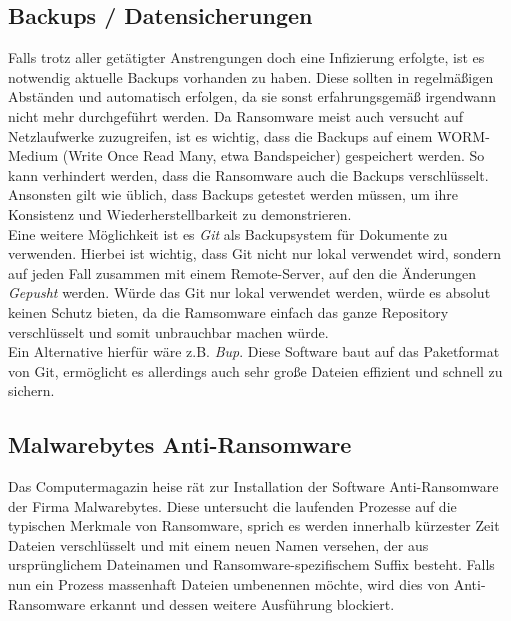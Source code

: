 \subsection{Backups / Datensicherungen}

	Falls trotz aller getätigter Anstrengungen doch eine Infizierung erfolgte, ist es notwendig aktuelle Backups vorhanden zu haben. Diese sollten in regelmäßigen Abständen und automatisch erfolgen, da sie sonst erfahrungsgemäß irgendwann nicht mehr durchgeführt werden. Da Ransomware meist auch versucht auf Netzlaufwerke zuzugreifen, ist es wichtig, dass die Backups auf einem WORM-Medium (Write Once Read Many, etwa Bandspeicher) gespeichert werden. So kann verhindert werden, dass die Ransomware auch die Backups verschlüsselt.\\
	Ansonsten gilt wie üblich, dass Backups getestet werden müssen, um ihre Konsistenz und Wiederherstellbarkeit zu demonstrieren.\\
	Eine weitere Möglichkeit ist es \textit{Git} als Backupsystem für Dokumente zu verwenden. Hierbei ist wichtig, dass Git nicht nur lokal verwendet wird, sondern auf jeden Fall zusammen mit einem Remote-Server, auf den die Änderungen \textit{Gepusht} werden. Würde das Git nur lokal verwendet werden, würde es absolut keinen Schutz bieten, da die Ramsomware einfach das ganze Repository verschlüsselt und somit unbrauchbar machen würde.\\
	Ein Alternative hierfür wäre z.B. \textit{Bup}. Diese Software baut auf das Paketformat von Git, ermöglicht es allerdings auch sehr große Dateien effizient und schnell zu sichern. \cite{bup}
	
	
	
\subsection{Malwarebytes Anti-Ransomware}

	Das Computermagazin \glqq heise\grqq{} rät zur Installation der Software \glqq Anti-Ransomware\grqq{} der Firma Malwarebytes. Diese untersucht die laufenden Prozesse auf die typischen Merkmale von Ransomware, sprich es werden innerhalb kürzester Zeit Dateien verschlüsselt und mit einem neuen Namen versehen, der aus ursprünglichem Dateinamen und Ransomware-spezifischem Suffix besteht. Falls nun ein Prozess massenhaft Dateien umbenennen möchte, wird dies von \glqq Anti-Ransomware\grqq{} erkannt und dessen weitere Ausführung blockiert. \cite{malwarebytes}

